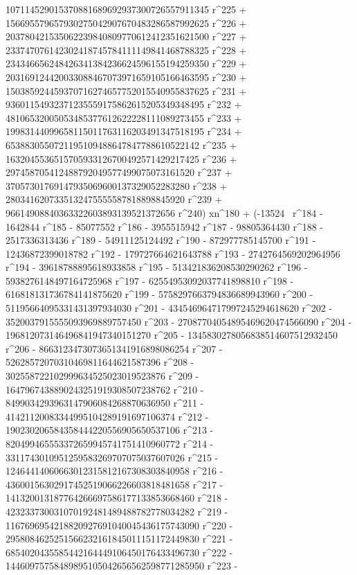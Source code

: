        107114529015370881689692937300726557911345 r^225 + 
       156695579657930275042907670483286587992625 r^226 + 
       203780421535062239840809770612412351621500 r^227 + 
       233747076142302418745784111149841468788325 r^228 + 
       234346656248426341384236624596155194259350 r^229 + 
       203169124420033088467073971659105166463595 r^230 + 
       150385924459370716274657752015540955837625 r^231 + 
       93601154932371235559175862615205349348495 r^232 + 
       48106532005053485377612622228111089273455 r^233 + 
       19983144099658115011763116203491347518195 r^234 + 
       6538830550721195109488647847788610522142 r^235 + 
       1632045536515705933126700492571429217425 r^236 + 
       297458705412488792049577499075073161520 r^237 + 
       37057301769147935069600137329052283280 r^238 + 
       2803416207335132475555587818898845920 r^239 + 
       96614908840363322603893139521372656 r^240) xn^180 + (-13524 \
r^184 - 1642844 r^185 - 85077552 r^186 - 3955515942 r^187 - 
       98805364430 r^188 - 2517336313436 r^189 - 
       54911125124492 r^190 - 872977785145700 r^191 - 
       12436872399018782 r^192 - 179727664621643788 r^193 - 
       2742764569202964956 r^194 - 39618788895618933858 r^195 - 
       513421836208530290262 r^196 - 5938276148497164725968 r^197 - 
       62554953092037741898810 r^198 - 
       616818131736784141875620 r^199 - 
       5758297663794836689943960 r^200 - 
       51195664095331431397934030 r^201 - 
       434546964717997245294618620 r^202 - 
       3520037915555093969889757450 r^203 - 
       27087704054895469620474566090 r^204 - 
       196812073146496841947340151270 r^205 - 
       1345830278056838514607512932450 r^206 - 
       8663123473073651341916898086254 r^207 - 
       52628572070310469811644621587396 r^208 - 
       302558722102999634525023019523876 r^209 - 
       1647967438890243251919308507238762 r^210 - 
       8499034293963147906084268870636950 r^211 - 
       41421120083344995104289191697106374 r^212 - 
       190230206584358444220556905650537106 r^213 - 
       820499465553372659945741751410960772 r^214 - 
       3311743010951259583269707075037607026 r^215 - 
       12464414060663012315812167308303840958 r^216 - 
       43600156302917452519066226603818481658 r^217 - 
       141320013187764266697586177133853668460 r^218 - 
       423233730031070192481489488782778034282 r^219 - 
       1167696954218820927691040045436175743090 r^220 - 
       2958084625251566232161845011151172449830 r^221 - 
       6854020435585442164449106450176433496730 r^222 - 
       14460975758489895105042656562598771285950 r^223 - 
